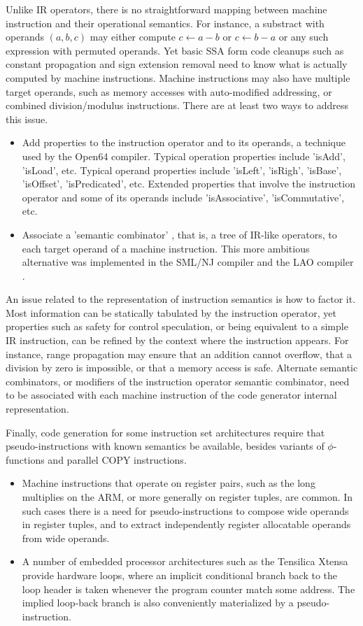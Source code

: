 Unlike IR operators, there is no straightforward mapping between machine
instruction and their operational semantics. For instance, a substract
with operands $(a,b,c)$ may either compute $c \leftarrow a-b$ or $c
\leftarrow b-a$ or any such expression with permuted operands. Yet basic SSA
form code cleanups such as constant propagation and sign extension removal need
to know what is actually computed by machine instructions.  Machine instructions
may also have multiple target operands, such as memory accesses with
auto-modified addressing, or combined division/modulus instructions.
There are at least two ways to address this issue. \begin{itemize}
\item Add properties to the instruction operator and to its operands, a
technique used by the Open64 compiler. Typical operation properties include
'isAdd', 'isLoad', etc. Typical operand properties include 'isLeft', 'isRigh',
'isBase', 'isOffset', 'isPredicated', etc. Extended properties that involve the
instruction operator and some of its operands include 'isAssociative',
'isCommutative', etc.
\item Associate a 'semantic combinator' \cite{Leung:1999:PLDI}, that is, a tree
of IR-like operators, to each target operand of a machine instruction. This more
ambitious alternative was implemented in the SML/NJ \cite{Leung:1999:PLDI}
compiler and the LAO compiler \cite{Dinechin:2000:CASES}.  \end{itemize}

An issue related to the representation of instruction semantics is how to factor
it. Most information can be statically tabulated by the instruction operator, yet
properties such as safety for control speculation, or being equivalent to a
simple IR instruction, can be refined by the context where the instruction
appears. For instance, range propagation may ensure that an addition cannot
overflow, that a division by zero is impossible, or that a memory access is safe.
Alternate semantic combinators, or modifiers of the instruction operator semantic
combinator, need to be associated with each machine instruction of the code
generator internal representation.

Finally, code generation for some instruction set architectures require that
pseudo-instructions with known semantics be available, besides variants of
$\phi$-functions and parallel COPY instructions. \begin{itemize}
\item Machine instructions that
operate on register pairs, such as the long multiplies on the ARM, or more
generally on register tuples, are common. In such cases there is a need for
pseudo-instructions to compose wide operands in register tuples, and to extract
independently register allocatable operands from wide operands.
\item A number of embedded processor architectures such as the Tensilica Xtensa
provide hardware loops, where an implicit conditional branch back to the loop
header is taken whenever the program counter match some address. The implied
loop-back branch is also conveniently materialized by a pseudo-instruction.
\end{itemize}

